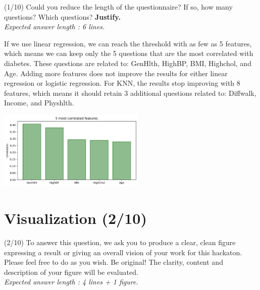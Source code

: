 \documentclass [a4paper, 11pt] {article}
\begin{document}
\begin{question}{2.4}
(1/10) Could you reduce the length of the questionnaire? If so, how many questions? Which questions? \textbf{Justify.}\\
\textit{Expected answer length : 6 lines.}
\end{question}
\begin{answer}\color{blue}
If we use linear regression, we can reach the threshold with as few as 5 features, which means we can keep only the 5 questions 
that are the most correlated with diabetes. These questions are related to: GenHlth, HighBP, BMI, Highchol, and Age. 
Adding more features does not improve the results for either linear regression or logistic regression. For KNN, the results 
stop improving with 8 features, which means it should retain 3 additional questions related to: Diffwalk, Income, and Physhlth.

\begin{center}
    \includegraphics[width=7cm]{BestCorr.png}
\end{center}

\end{answer}


\section{Visualization (2/10)}

\begin{question}{3.1}
(2/10) To answer this question, we ask you to produce a clear, clean figure expressing a result or giving an overall vision of your work for this hackaton. Please feel free to do as you wish. Be original! The clarity, content and description of your figure will be evaluated.\\
\textit{Expected answer length : 4 lines + 1 figure.}
\end{question}
\begin{answer}\color{blue}
\end{answer}
\pagebreak
\end{document}
